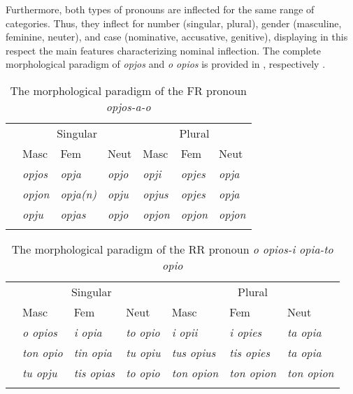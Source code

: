 \documentclass[output=paper]{langsci/langscibook}
\begin{document}
Furthermore, both types of pronouns are inflected for the same range of
categories. Thus, they inflect for number (singular, plural), gender
(masculine, feminine, neuter), and case (nominative, accusative,
genitive), displaying in this respect the main features
characterizing  nominal inflection. The complete morphological
paradigm of \emph{opjos} and \emph{o opios} is provided in
, respectively \parencite[100]{HolMacPhiWar2004}.

\begin{table}
\caption{The morphological paradigm of the \gls{FR} pronoun
\emph{opjos-a-o}}\label{tab:1}
\begin{tabularx}{\textwidth}{lXXXXXX}
\lsptoprule
           & \multicolumn{3}{c}{Singular}                & \multicolumn{3}{c}{Plural}  \\\cmidrule(lr){2-4}\cmidrule(lr){5-7}
           & Masc         & Fem            & Neut        & Masc         & Fem          & Neut\\
\midrule
\Nom{}     & \emph{opjos} & \emph{opja}    & \emph{opjo} & \emph{opji}  & \emph{opjes} & \emph{opja}\\
\Acc{}     & \emph{opjon} & \emph{opja(n)} & \emph{opju} & \emph{opjus} &
\emph{opjes} & \emph{opja}\\
\Gen{}     & \emph{opju}  & \emph{opjas}   & \emph{opjo} & \emph{opjon} &
\emph{opjon} & \emph{opjon}\\
\lspbottomrule
\end{tabularx}
\end{table}

\begin{table}
\caption{The morphological paradigm of the \gls{RR} pronoun \emph{o opios-i opia-to opio}}\label{tab:2}
\begin{tabularx}{\textwidth}{lXXXXXX}
\lsptoprule
            & \multicolumn{3}{c}{Singular}                & \multicolumn{3}{c}{Plural}  \\\cmidrule(lr){2-4}\cmidrule(lr){5-7}
            & Masc            & Fem              & Neut           & Masc             & Fem              & Neut\\
\midrule
\Nom{}      & \emph{o opios}  & \emph{i opia}    & \emph{to opio} & \emph{i opii}    & \emph{i opies}   & \emph{ta opia}\\
\Acc{}      & \emph{ton opio} & \emph{tin opia}  & \emph{tu opiu} & \emph{tus opius} & \emph{tis opies} & \emph{ta opia}\\
\Gen{}      & \emph{tu opju}  & \emph{tis opias} & \emph{to opio} & \emph{ton opion} & \emph{ton opion} & \emph{ton opion}\\
\lspbottomrule
\end{tabularx}
\end{table}
\end{document}
